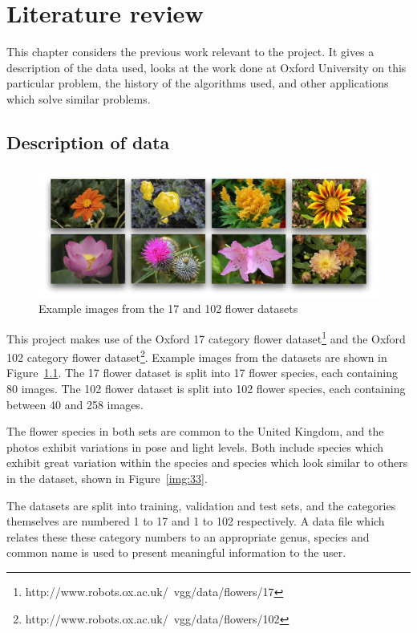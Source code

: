 \documentclass[11pt, a4paper]{report}
\begin{document}
\chapter{Literature review}


This chapter considers the previous work relevant to the project. It gives a description of the data used, looks at the work done at Oxford University on this particular problem, the history of the algorithms used, and other applications which solve similar problems. 


\section{Description of data}

\begin{figure}[hbt]
	\centering
  \includegraphics[totalheight=6cm]{img/26.png}
  \caption{Example images from the 17 and 102 flower datasets}
  \label{img:26}
\end{figure}

This project makes use of the Oxford 17 category flower dataset\footnote{http://www.robots.ox.ac.uk/~vgg/data/flowers/17} and the Oxford 102 category flower dataset\footnote{http://www.robots.ox.ac.uk/~vgg/data/flowers/102}. Example images from the datasets are shown in Figure~\ref{img:26}. The 17 flower dataset is split into 17 flower species, each containing 80 images. The 102 flower dataset is split into 102 flower species, each  containing between 40 and 258 images.

The flower species in both sets are common to the United Kingdom, and the photos exhibit variations in pose and light levels. Both include species which exhibit great variation within the species and species which look similar to others in the dataset, shown in Figure~\ref{img:33}.

The datasets are split into training, validation and test sets, and the categories themselves are numbered 1 to 17 and 1 to 102 respectively. A data file which relates these these category numbers to an appropriate genus, species and common name is used to present meaningful information to the user. 
\end{document}
